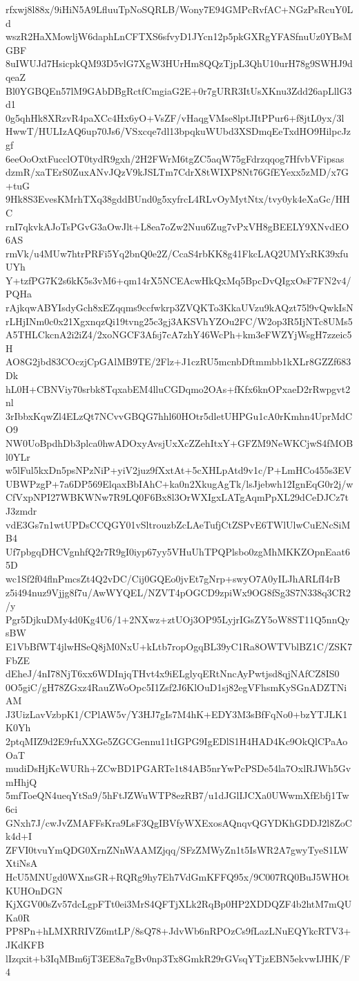 rfxwj8l88x/9iHiN5A9LfluuTpNoSQRLB/Wony7E94GMPcRvfAC+NGzPsRcuY0Ld
wszR2HaXMowljW6daphLnCFTXS6sfvyD1JYcn12p5pkGXRgYFASfnuUz0YBsMGBF
8uIWUJd7HsicpkQM93D5vlG7XgW3HUrHm8QQzTjpL3QhU10urH78g9SWHJ9dqeaZ
Bl0YGBQEn57lM9GAbDBgRctfCmgiaG2E+0r7gURR3ItUsXKnu3Zdd26apLllG3d1
0g5qhHk8XRzvR4paXCc4Hx6yO+VsZF/vHaqgVMse8lptJItPPur6+f8jtL0yx/3l
HwwT/HULIzAQ6up70Js6/VSxcqe7dl13bpqkuWUbd3XSDmqEeTxdHO9HilpcJzgf
6eeOoOxtFucclOT0tydR9gxh/2H2FWrM6tgZC5aqW75gFdrzqqog7HfvbVFipsas
dzmR/xaTErS0ZuxANvJQzV9kJSLTm7CdrX8tWIXP8Nt76GfEYexx5zMD/x7G+tuG
9Hk8S3EvesKMrhTXq38gddBUnd0g5xyfrcL4RLvOyMytNtx/tvy0yk4eXaGc/HHC
rnI7qkvkAJoTsPGvG3aOwJlt+L8ea7oZw2Nuu6Zug7vPxVH8gBEELY9XNvdEO6AS
rmVk/u4MUw7htrPRFi5Yq2bnQ0e2Z/CcaS4rbKK8g41FkcLAQ2UMYxRK39xfuUYh
Y+tzfPG7K2s6kK5s3vM6+qm14rX5NCEAcwHkQxMq5BpcDvQIgxOsF7FN2v4/PQHa
rAjkqwABYIsdyGch8xEZqqms9ccfwkrp3ZVQKTo3KkaUVzu9kAQzt75l9vQwkIsN
rLHjINm0c0x21XgxnqzQi19tvng25c3gj3AKSVhYZOu2FC/W2op3R5IjNTc8UMs5
A5THLCkcnA2i2iZ4/2xoNGCF3Afsj7cA7zhY46WcPh+km3eFWZYjWsgH7zzeic5H
AO8G2jbd83COczjCpGAlMB9TE/2Flz+J1czRU5mcnbDftmmbb1kXLr8GZZf683Dk
hL0H+CBNViy70srbk8TqxabEM4lluCGDqmo2OAs+fKfx6knOPxaeD2rRwpgvt2nl
3rIbbxKqwZl4ELzQt7NCvvGBQG7hhl60HOtr5dletUHPGu1cA0rKmhn4UprMdCO9
NW0UoBpdhDb3plca0hwADOxyAvsjUxXcZZehItxY+GFZM9NeWKCjwS4fMOBl0YLr
w5lFul5kxDn5psNPzNiP+yiV2juz9fXxtAt+5cXHLpAtd9v1c/P+LmHCo455s3EV
UBWPzgP+7a6DP569ElqaxBbIAhC+ka0n2XkugAgTk/lsJjebwh12IgnEqG0r2j/w
CfVxpNPI27WBKWNw7R9LQ0F6Bx8l3OrWXIgxLATgAqmPpXL29dCeDJCz7tJ3zmdr
vdE3Gs7n1wtUPDsCCQGY01vSltrouzbZcLAeTufjCtZSPvE6TWlUlwCuENcSiMB4
Uf7pbgqDHCVgnhfQ2r7R9gI0iyp67yy5VHuUhTPQPlsbo0zgMhMKKZOpnEaat65D
wc1Sf2f04flnPmcsZt4Q2vDC/Cij0GQEo0jvEt7gNrp+swyO7A0yILJhARLfI4rB
z5i494nuz9Vjjg8f7u/AwWYQEL/NZVT4pOGCD9zpiWx9OG8fSg3S7N338q3CR2/y
Pgr5DjkuDMy4d0Kg4U6/1+2NXwz+ztUOj3OP95LyjrIGsZY5oW8ST11Q5nnQysBW
E1VbBfWT4jlwHSeQ8jM0NxU+kLtb7ropOgqBL39yC1Ra8OWTVblBZ1C/ZSK7FbZE
dEheJ/4nI78NjT6xx6WDInjqTHvt4x9iELglyqERtNncAyPwtjsd8qjNAfCZ8IS0
0O5giC/gH78ZGxz4RauZWoOpc5I1Zsf2J6KlOuD1sj82egVFhsmKySGnADZTNiAM
J3UizLavVzbpK1/CPlAW5v/Y3HJ7gIs7M4hK+EDY3M3sBfFqNo0+bzYTJLK1K0Yh
2ptqMIZ9d2E9rfuXXGe5ZGCGennu11tIGPG9IgEDlS1H4HAD4Kc9OkQlCPaAoOaT
mudiDsHjKcWURh+ZCwBD1PGARTe1t84AB5nrYwPcPSDe54la7OxlRJWh5GvmHhjQ
5mfToeQN4ueqYtSa9/5hFtJZWuWTP8ezRB7/u1dJGlIJCXa0UWwmXfEbfj1Tw6ci
GNxh7J/cwJvZMAFFsKra9LsF3QgIBVfyWXExosAQnqvQGYDKhGDDJ2l8ZoCk4d+I
ZFVI0tvuYmQDG0XrnZNnWAAMZjqq/SFzZMWyZn1t5IsWR2A7gwyTyeS1LWXtiNsA
HcU5MNUgd0WXnsGR+RQRg9hy7Eh7VdGmKFFQ95x/9C007RQ0BuJ5WHOtKUHOnDGN
KjXGV00sZv57dcLgpFTt0ei3MrS4QFTjXLk2RqBp0HP2XDDQZF4b2htM7mQUKa0R
PP8Pn+hLMXRRIVZ6mtLP/8sQ78+JdvWb6nRPOzCs9fLazLNuEQYkcRTV3+JKdKFB
lIzqxit+b3IqMBm6jT3EE8a7gBv0np3Tx8GmkR29rGVsqYTjzEBN5ekvwIJHK/F4
